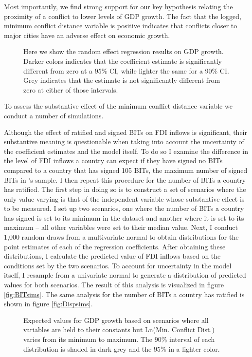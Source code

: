 Most importantly, we find strong support for our key hypothesis relating the proximity of a conflict to lower levels of GDP growth. The fact that the logged, minimum conflict distance variable is positive indicates that conflicts closer to major cities have an adverse effect on economic growth. 

\begin{figure}[ht]
	\centering
	\resizebox{.6\textwidth}{!}{}
	\caption{Here we show the random effect regression results on GDP growth. Darker colors indicates that the coefficient estimate is significantly different from zero at a 95\% CI, while lighter the same for a 90\% CI. Grey indicates that the estimate is not significantly different from zero at either of those intervals.}
	\label{fig:coefPlot}	
\end{figure}
\FloatBarrier

To assess the substantive effect of the minimum conflict distance variable we conduct a number of simulations. 

Although the effect of ratified and signed BITs on FDI inflows is significant, their substantive meaning is questionable when taking into account the uncertainty of the coefficient estimates and the model itself. To do so I examine the difference in the level of FDI inflows a country can expect if they have signed no BITs compared to a country that has signed 105 BITs, the maximum number of signed BITs in \citeauthor{allee2011contingent}'s sample. I then repeat this procedure for the number of BITs a country has ratified. The first step in doing so is to construct a set of scenarios where the only value varying is that of the independent variable whose substantive effect is to be measured. I set up two scenarios, one where the number of BITs a country has signed is set to its minimum in the dataset and another where it is set to its maximum -- all other variables were set to their median value. Next, I conduct 1,000 random draws from a multivariate normal to obtain distributions for the point estimates of each of the regression coefficients. After obtaining these distributions, I calculate the predicted value of FDI inflows based on the conditions set by the two scenarios. To account for uncertainty in the model itself, I resample from a univariate normal to generate a distribution of predicted values for both scenarios. The result of this analysis is visualized in figure \ref{fig:BITsims}. The same analysis for the number of BITs a country has ratified is shown in figure \ref{fig:Dispsims}.

\begin{figure}[ht]
	\centering
	\resizebox{.8\textwidth}{!}{}
	\caption{Expected values for GDP growth based on scenarios where all variables are held to their constants but Ln(Min. Conflict Dist.) varies from its minimum to maximum. The 90\% interval of each distribution is shaded in dark grey and the 95\% in a lighter color.}
	\label{fig:simsPlot}
\end{figure}
\FloatBarrier